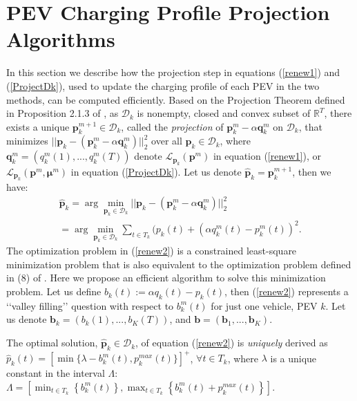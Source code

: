 \documentclass[12pt,draftcls,onecolumn]{IEEEtran}
\begin{document}
\section{PEV Charging Profile Projection Algorithms}\label{sec:comp-algos}
\indent In this section we describe how the projection step in equations (\ref{renew1}) and (\ref{ProjectDk}), used to update the charging profile of each PEV in the two methods, can be computed efficiently. Based on the Projection Theorem defined in Proposition 2.1.3 of \cite{B99}, as $\mathcal{D}_k$ is nonempty, closed and convex subset of $\mathbb{R}^T$, there exists a unique $\mathbf{p}^{m+1}_k \in \mathcal{D}_k$, called the \emph{projection} of $\mathbf{p}_{k}^{m}-\alpha \mathbf{q}_k^m$ on $\mathcal{D}_k$, that minimizes $||\mathbf{p}_k - (\mathbf{p}_{k}^{m} - \alpha \mathbf{q}_k^m)||^2_2$ over all $\mathbf{p}_k \in \mathcal{D}_k$, where $\mathbf{q}_k^{m}=(q_k^{m}(1), ..., q_k^{m}(T))$ denote $\mathcal{L}_{\mathbf{p}_k}(\mathbf{p}^{m})$ in equation (\ref{renew1}), or $\mathcal{L}_{\mathbf{p}_k}(\mathbf{p}^{m}, \mathbf{\mu}^{m})$ in equation (\ref{ProjectDk}). Let us denote $\hat{\mathbf{p}}_k=\mathbf{p}_k^{m+1}$, then we have:
\begin{gather}
\hat{\mathbf{p}}_{k}=\arg\min_{\mathbf{p}_k \in \mathcal{D}_k} ||\mathbf{p}_k-(\mathbf{p}_{k}^{m}-\alpha \mathbf{q}_k^m)||_2^{2} \nonumber \\
= \arg\min_{\mathbf{p}_k \in \mathcal{D}_k}\sum_{t \in T_k}(p_k(t)+(\alpha q^m_k(t)-p_k^m(t))^2.
\label{renew2}
\end{gather}
The optimization problem in (\ref{renew2}) is a constrained least-square minimization problem that is also equivalent to the optimization problem defined in (8) of \cite{GTL13}. Here we propose an efficient algorithm to solve this minimization problem. Let us define $b_k(t):= \alpha q_k(t)-p_k(t)$, then (\ref{renew2}) represents a \lq\lq{}valley filling\rq\rq{} question with respect to $b_k^m(t)$ for just one vehicle, PEV $k$. Let us denote $\mathbf{b}_{k}=(b_k(1), ..., b_K(T))$, and $\mathbf{b}=(\mathbf{b}_1, ..., \mathbf{b}_K)$.
\begin{Thm}
The optimal solution, $\hat{\mathbf{p}}_k \in \mathcal{D}_k$, of equation (\ref{renew2}) is \emph{uniquely} derived as $\hat{p}_k(t) = [\min\{\lambda-b_k^m(t), p_k^{max}(t)\}]^{+}$, $\forall t \in T_k$, where $\lambda$ is a unique constant in the interval $\Lambda$:\\ $\Lambda=[\min_{t\in T_k}\left\{b_k^m(t)\right\}, \max_{t\in T_k} \left\{ b_k^m(t) +p_k^{max}(t)\right\}]$.
\label{valleyfill1}
\end{Thm}
\end{document}
